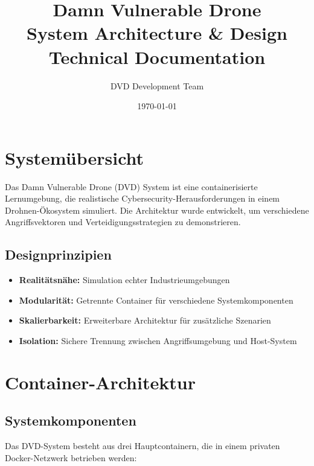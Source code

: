\documentclass[11pt,a4paper]{article}
\begin{document}
\title{\textbf{Damn Vulnerable Drone} \\ System Architecture \& Design \\ \large{Technical Documentation}}
\author{DVD Development Team}
\date{\today}

\maketitle

\tableofcontents
\newpage

\section{Systemübersicht}

Das Damn Vulnerable Drone (DVD) System ist eine containerisierte Lernumgebung, die realistische Cybersecurity-Herausforderungen in einem Drohnen-Ökosystem simuliert. Die Architektur wurde entwickelt, um verschiedene Angriffsvektoren und Verteidigungsstrategien zu demonstrieren.

\subsection{Designprinzipien}

\begin{itemize}
    \item \textbf{Realitätsnähe:} Simulation echter Industrieumgebungen
    \item \textbf{Modularität:} Getrennte Container für verschiedene Systemkomponenten
    \item \textbf{Skalierbarkeit:} Erweiterbare Architektur für zusätzliche Szenarien
    \item \textbf{Isolation:} Sichere Trennung zwischen Angriffsumgebung und Host-System
\end{itemize}

\section{Container-Architektur}

\subsection{Systemkomponenten}

Das DVD-System besteht aus drei Hauptcontainern, die in einem privaten Docker-Netzwerk betrieben werden:
\end{document}
